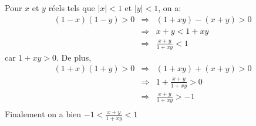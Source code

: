 Pour $x$ et $y$ réels tels que $|x|<1$ et $|y|<1$, on a:
\begin{eqnarray*}
    (1-x)(1-y) > 0 &\Rightarrow& (1+xy)-(x+y)>0 \\
    &\Rightarrow& x+y < 1+xy \\
    &\Rightarrow& \frac{x+y}{1+xy} < 1
\end{eqnarray*}
car $1+xy>0$. De plus, 
\begin{eqnarray*}
    (1+x)(1+y) > 0 &\Rightarrow& (1+xy)+(x+y)>0 \\
    &\Rightarrow& 1+\frac{x+y}{1+xy} > 0 \\
    &\Rightarrow& \frac{x+y}{1+xy} > -1 \\
\end{eqnarray*}
Finalement on a bien $-1 < \frac{x+y}{1+xy} < 1$
